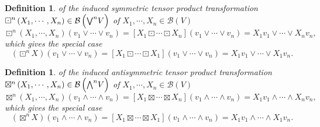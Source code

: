 \documentclass[aps,preprint]{revtex4}%
\newtheorem{definition}[theorem]{Definition}
\begin{document}
\begin{definition}
of the induced symmetric tensor product transformation ${\large \boxdot}%
^{n}\left(  X_{1},\cdots,X_{n}\right)  \in\mathcal{B}\left(  \overset{}{%
{\textstyle\bigvee\nolimits^{n}}
V}\right)  $ of $X_{1},\cdots,X_{n}\in\mathcal{B}\left(  V\right)  $
\begin{equation}
\boxdot^{n}\left(  X_{1},\cdots,X_{n}\right)  \left(  v_{1}\vee\cdots\vee
v_{n}\right)  =\left[  X_{1}\boxdot\cdots\boxdot X_{n}\right]  \left(
v_{1}\vee\cdots\vee v_{n}\right)  =X_{1}v_{1}\vee\cdots\vee X_{n}v_{n},
\end{equation}
which gives the special case
\begin{equation}
\left(  \boxdot^{n}X\right)  \left(  v_{1}\vee\cdots\vee v_{n}\right)
=\left[  X_{1}\boxdot\cdots\boxdot X_{1}\right]  \left(  v_{1}\vee\cdots\vee
v_{n}\right)  =X_{1}v_{1}\vee\cdots\vee X_{1}v_{n}.
\end{equation}

\end{definition}

\begin{definition}
of the induced antisymmetric tensor product transformation $\boxtimes
^{n}\left(  X_{1},\cdots,X_{n}\right)  \in\mathcal{B}\left(  \overset{}{%
{\textstyle\bigwedge\nolimits^{n}}
V}\right)  $ of $X_{1},\cdots,X_{n}\in\mathcal{B}\left(  V\right)  $
\begin{equation}
\boxtimes^{n}\left(  X_{1},\cdots,X_{n}\right)  \left(  v_{1}\wedge
\cdots\wedge v_{n}\right)  =\left[  X_{1}\boxtimes\cdots\boxtimes
X_{n}\right]  \left(  v_{1}\wedge\cdots\wedge v_{n}\right)  =X_{1}v_{1}%
\wedge\cdots\wedge X_{n}v_{n},
\end{equation}
which gives the special case
\begin{equation}
\left(  \boxtimes^{n}X\right)  \left(  v_{1}\wedge\cdots\wedge v_{n}\right)
=\left[  X_{1}\boxtimes\cdots\boxtimes X_{1}\right]  \left(  v_{1}\wedge
\cdots\wedge v_{n}\right)  =X_{1}v_{1}\wedge\cdots\wedge X_{1}v_{n}.
\end{equation}

\end{definition}
\end{document}
